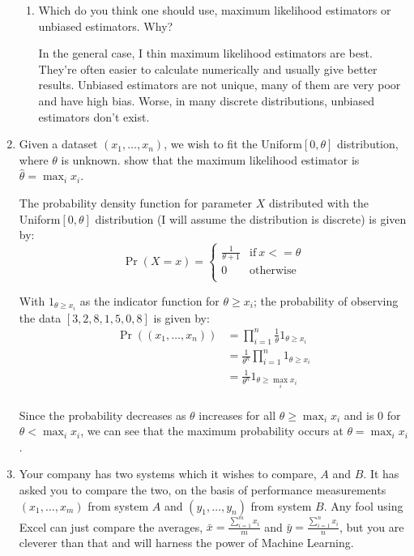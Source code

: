 \documentclass[10pt,\jkfside,a4paper]{article}
\begin{document}
\begin{enumerate}
\begin{enumerate}
\item Which do you think one should use, maximum likelihood estimators or
unbiased estimators. Why?

In the general case, I thin maximum likelihood estimators are best. They're
often easier to calculate numerically and usually give better results. Unbiased
estimators are not unique, many of them are very poor and have high bias.
Worse, in many discrete distributions, unbiased estimators don't exist.

\end{enumerate}

\item Given a dataset $(x_1, \dots, x_n)$, we wish to fit the Uniform$[0,
\theta]$ distribution, where $\theta$ is unknown. show that the maximum
likelihood estimator is $\hat{\theta} = \max_i x_i$.

The probability density function for parameter $X$ distributed with the
Uniform$[0, \theta]$ distribution (I will assume the distribution is discrete)
is given by:
\[
\Pr(X = x) =
\begin{cases}
\frac{1}{\theta + 1} & \text{if} \ x <= \theta \\
0 & \text{otherwise} \\
\end{cases}
\]

With $1_{\theta \geq x_i}$ as the indicator function for $\theta \geq x_i$;
the probability of observing the data $[3, 2, 8, 1, 5, 0, 8]$ is given by:
\[
\begin{split}
\Pr((x_1, \dots, x_n)) &= \prod^n_{i=1} \frac{1}{\theta} 1_{\theta \geq x_i} \\
&= \frac{1}{\theta^n} \prod^n_{i=1} 1_{\theta \geq x_i} \\
&= \frac{1}{\theta^n} 1_{\theta \geq \max_i x_i} \\
\end{split}
\]

Since the probability decreases as $\theta$ increases for all $\theta \geq
\max_i x_i$ and is 0 for $\theta < \max_i x_i$, we can see that the maximum
probability occurs at $\theta = \max_i x_i$.

\item Your company has two systems which it wishes to compare, $A$ and $B$.
It has asked you to compare the two, on the basis of performance
measurements $(x_1, \dots, x_m)$ from system $A$ and $(y_1, \dots, y_n)$
from system $B$. Any fool using Excel can just compare the averages,
$\bar{x} = \frac{\sum^m_{i=1}x_i}{m}$ and $\bar{y} =
\frac{\sum^n_{i=1}x_i}{n}$, but you are cleverer than that and will harness
the power of Machine Learning.


\end{enumerate}
\end{document}
